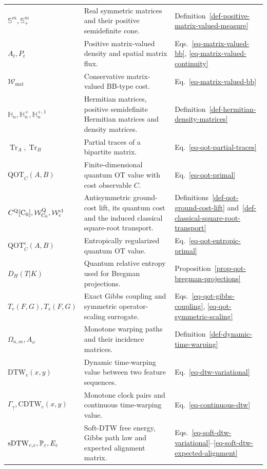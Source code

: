 {\begin{longtable}{>{\raggedright\arraybackslash}p{}
                  >{\raggedright\arraybackslash}p{}
                  >{\raggedright\arraybackslash}p{}}
$\mathbb S^m,\mathbb S_+^m$ & Real symmetric matrices and their positive semidefinite cone. & Definition~\ref{def-positive-matrix-valued-measure} \\
$A_t,P_t$ & Positive matrix-valued density and spatial matrix flux. & Eqs.~\eqref{eq-matrix-valued-bb}, \eqref{eq-matrix-valued-continuity} \\
$\mathcal W_{\mathrm{mat}}$ & Conservative matrix-valued BB-type cost. & Eq.~\eqref{eq-matrix-valued-bb} \\
$\mathbb H_n,\mathbb H_n^+,\mathbb H_n^{+,1}$ & Hermitian matrices, positive semidefinite Hermitian matrices and density matrices. & Definition~\ref{def-hermitian-density-matrices} \\
$\operatorname{Tr}_A,\operatorname{Tr}_B$ & Partial traces of a bipartite matrix. & Eq.~\eqref{eq-qot-partial-traces} \\
$\mathrm{QOT}_C(A,B)$ & Finite-dimensional quantum OT value with cost observable $C$. & Eq.~\eqref{eq-qot-primal} \\
$C^{\mathrm Q}[\mathrm{C}_0],\mathcal W_{\mathrm{C}_0}^{\mathrm Q},\mathcal W_c^{\mathrm{cl}}$ & Antisymmetric ground-cost lift, its quantum cost and the induced classical square-root transport. & Definitions~\ref{def-qot-ground-cost-lift} and~\ref{def-classical-square-root-transport} \\
$\mathrm{QOT}_C^\epsilon(A,B)$ & Entropically regularized quantum OT value. & Eq.~\eqref{eq-qot-entropic-primal} \\
$D_H(T|K)$ & Quantum relative entropy used for Bregman projections. & Proposition~\ref{prop-qot-bregman-projections} \\
$T_e(F,G),T_s(F,G)$ & Exact Gibbs coupling and symmetric operator-scaling surrogate. & Eqs.~\eqref{eq-qot-gibbs-coupling}, \eqref{eq-qot-symmetric-scaling} \\
$\Omega_{n,m},A_\omega$ & Monotone warping paths and their incidence matrices. & Definition~\ref{def-dynamic-time-warping} \\
$\mathrm{DTW}_c(x,y)$ & Dynamic time-warping value between two feature sequences. & Eq.~\eqref{eq-dtw-variational} \\
$\Gamma_\uparrow,\mathrm{CDTW}_c(x,y)$ & Monotone clock pairs and continuous time-warping value. & Eq.~\eqref{eq-continuous-dtw} \\
$\mathrm{sDTW}_{c,\varepsilon},\mathbb{P}_\varepsilon,E_\varepsilon$ & Soft-DTW free energy, Gibbs path law and expected alignment matrix. & Eqs.~\eqref{eq-soft-dtw-variational}--\eqref{eq-soft-dtw-expected-alignment} \\


\end{longtable}}
